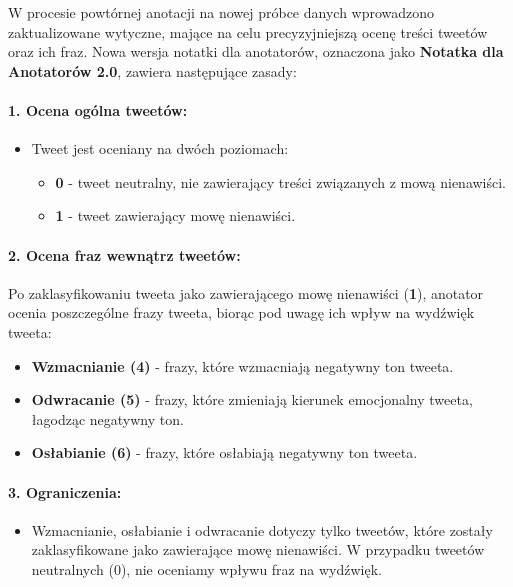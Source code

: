 \documentclass[12pt]{article}
\begin{document}
W procesie powtórnej anotacji na nowej próbce danych wprowadzono zaktualizowane wytyczne, mające na celu precyzyjniejszą ocenę treści tweetów oraz ich fraz. Nowa wersja notatki dla anotatorów, oznaczona jako \textbf{Notatka dla Anotatorów 2.0}, zawiera następujące zasady:

\paragraph{1. Ocena ogólna tweetów:}
\begin{itemize}
    \item Tweet jest oceniany na dwóch poziomach:
    \begin{itemize}
        \item \textbf{0} - tweet neutralny, nie zawierający treści związanych z mową nienawiści.
        \item \textbf{1} - tweet zawierający mowę nienawiści.
    \end{itemize}
\end{itemize}

\paragraph{2. Ocena fraz wewnątrz tweetów:}
Po zaklasyfikowaniu tweeta jako zawierającego mowę nienawiści (\textbf{1}), anotator ocenia poszczególne frazy tweeta, biorąc pod uwagę ich wpływ na wydźwięk tweeta:
\begin{itemize}
    \item \textbf{Wzmacnianie (4)} - frazy, które wzmacniają negatywny ton tweeta.
    \item \textbf{Odwracanie (5)} - frazy, które zmieniają kierunek emocjonalny tweeta, łagodząc negatywny ton.
    \item \textbf{Osłabianie (6)} - frazy, które osłabiają negatywny ton tweeta.
\end{itemize}

\paragraph{3. Ograniczenia:}
\begin{itemize}
    \item Wzmacnianie, osłabianie i odwracanie dotyczy tylko tweetów, które zostały zaklasyfikowane jako zawierające mowę nienawiści. W przypadku tweetów neutralnych (0), nie oceniamy wpływu fraz na wydźwięk.
\end{itemize}
\end{document}
